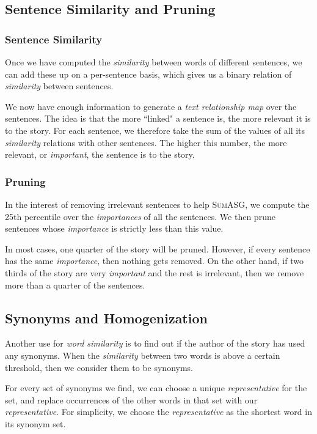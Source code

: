 \subsection{Sentence Similarity and Pruning}

\subsubsection{Sentence Similarity}

Once we have computed the \textit{similarity} between words of different sentences, we can add these up on a per-sentence basis, which gives us a binary relation of \textit{similarity} between sentences.

We now have enough information to generate a \textit{text relationship map} over the sentences. The idea is that the more ``linked" a sentence is, the more relevant it is to the story. For each sentence, we therefore take the sum of the values of all its \textit{similarity} relations with other sentences. The higher this number, the more relevant, or \textit{important}, the sentence is to the story.

\subsubsection{Pruning}

In the interest of removing irrelevant sentences to help \textsc{SumASG}, we compute the 25th percentile over the \textit{importances} of all the sentences. We then prune sentences whose \textit{importance} is strictly less than this value.

In most cases, one quarter of the story will be pruned. However, if every sentence has the same \textit{importance}, then nothing gets removed. On the other hand, if two thirds of the story are very \textit{important} and the rest is irrelevant, then we remove more than a quarter of the sentences.

\subsection{Synonyms and Homogenization}

Another use for \textit{word similarity} is to find out if the author of the story has used any synonyms. When the \textit{similarity} between two words is above a certain threshold, then we consider them to be synonyms.

For every set of synonyms we find, we can choose a unique \textit{representative} for the set, and replace occurrences of the other words in that set with our \textit{representative}. For simplicity, we choose the \textit{representative} as the shortest word in its synonym set.

